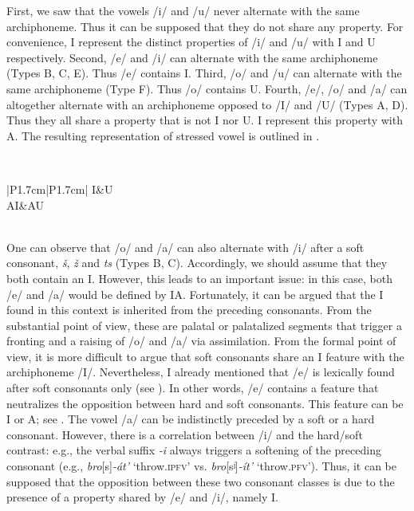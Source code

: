 \documentclass[output=paper,modfonts,newtxmath,hidelinks,]{langscibook}
\begin{document}
First, we saw that the vowels /i/ and /u/ never alternate with the same archiphoneme. Thus it can be supposed that they do not share any property. For convenience, I represent the distinct properties of /i/ and /u/ with {\textbar}I{\textbar} and {\textbar}U{\textbar} respectively. Second, /e/ and /i/ can alternate with the same archiphoneme (Types B, C, E). Thus /e/ contains {\textbar}I{\textbar}. Third, /o/ and /u/ can alternate with the same archiphoneme (Type F). Thus /o/ contains {\textbar}U{\textbar}. Fourth, /e/, /o/ and /a/ can altogether alternate with an archiphoneme opposed to /I/ and /U/ (Types A, D). Thus they all share a property that is not {\textbar}I{\textbar} nor {\textbar}U{\textbar}. I represent this property with {\textbar}A{\textbar}. The resulting representation of stressed vowel is outlined in .

\label{5:19}\\\medskip
\begin{tabular}{|P{1.7cm}|P{1.7cm}|}
\hline
\textbar I\textbar&\textbar U\textbar\\\hline
\textbar AI\textbar&\textbar AU\textbar\\\hline
{}\\\hline
\end{tabular}
\z

\noindent One can observe that /o/ and /a/ can also alternate with /i/ after a soft consonant, \textit{š}, \textit{ž} and \textit{ts} (Types B, C). Accordingly, we should assume that they both contain an {\textbar}I{\textbar}. However, this leads to an important issue: in this case, both /e/ and /a/ would be defined by {\textbar}IA{\textbar}. Fortunately, it can be argued that the {\textbar}I{\textbar} found in this context is inherited from the preceding consonants. From the substantial point of view, these are palatal or palatalized segments that trigger a fronting and a raising of /o/ and /a/ via assimilation. From the formal point of view, it is more difficult to argue that soft consonants share an {\textbar}I{\textbar} feature with the archiphoneme /I/. Nevertheless, I already mentioned that /e/ is lexically found after soft consonants only (see ). In other words, /e/ contains a feature that neutralizes the opposition between hard and soft consonants. This feature can be {\textbar}I{\textbar} or {\textbar}A{\textbar}; see . The vowel /a/ can be indistinctly preceded by a soft or a hard consonant. However, there is a correlation between /i/ and the hard/soft contrast: e.g., the verbal suffix \textit{-i} always triggers a softening of the preceding consonant (e.g., \textit{bro}[s]\textit{{}-}\textit{át’} `throw.\textsc{ipfv}' vs. \textit{bro}[sʲ]\textit{{}-}\textit{ít’} ‘throw.\textsc{pfv}’). Thus, it can be supposed that the opposition between these two consonant classes is due to the presence of a property shared by /e/ and /i/, namely {\textbar}I{\textbar}.
\end{document}
